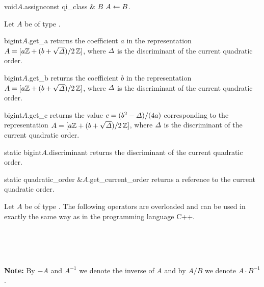 \begin{fcode}{void}{$A$.assign}{const qi_class & $B$}
  $A \leftarrow B$.
\end{fcode}



\ACCS

Let $A$ be of type .

\begin{cfcode}{bigint}{$A$.get_a}{}
  returns the coefficient $a$ in the representation $A = [a \mathbb{Z} + (b + \sqrt{\varDelta})/2\,\mathbb{Z} ]$,
  where $\varDelta$ is the discriminant of the current quadratic order.
\end{cfcode}

\begin{cfcode}{bigint}{$A$.get_b}{}
  returns the coefficient $b$ in the representation $A = [a \mathbb{Z} + (b + \sqrt{\varDelta})/2\, \mathbb{Z}
  ]$, where $\varDelta$ is the discriminant of the current quadratic order.
\end{cfcode}

\begin{cfcode}{bigint}{$A$.get_c}{}
  returns the value $c = (b^2 - \varDelta) / (4a)$ corresponding to the representation $A = [a \mathbb{Z} +
  (b + \sqrt{\varDelta})/2 \, \mathbb{Z} ]$, where $\varDelta$ is the discriminant of the current quadratic order.
\end{cfcode}

\begin{cfcode}{static bigint}{$A$.discriminant}{}
  returns the discriminant of the current quadratic order.
\end{cfcode}

\begin{cfcode}{static quadratic_order &}{$A$.get_current_order}{}
  returns a reference to the current quadratic order.
\end{cfcode}



\ARTH

Let $A$ be of type .  The following operators are overloaded and can be used in
exactly the same way as in the programming language C++.
\begin{center}
  \\
  \\
  \\
\end{center}
\textbf{Note:} By $-A$ and $A^{-1}$ we denote the inverse of $A$ and by $A / B$ we denote $A
\cdot B^{-1}$.

